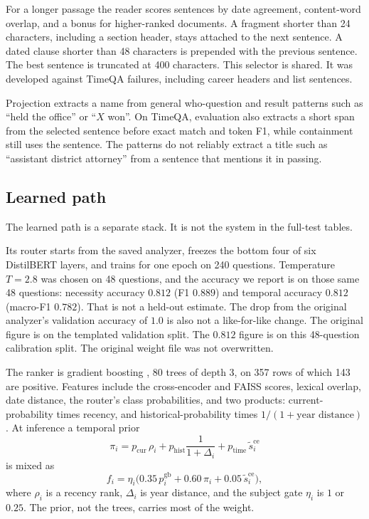 \documentclass[11pt]{article}
\begin{document}
For a longer passage the reader scores sentences by date agreement, content-word overlap, and a bonus for higher-ranked documents.
A fragment shorter than 24 characters, including a section header, stays attached to the next sentence.
A dated clause shorter than 48 characters is prepended with the previous sentence.
The best sentence is truncated at 400 characters.
This selector is shared.
It was developed against TimeQA failures, including career headers and list sentences.

Projection extracts a name from general who-question and result patterns such as ``held the office'' or ``$X$ won''.
On TimeQA, evaluation also extracts a short span from the selected sentence before exact match and token F1, while containment still uses the sentence.
The patterns do not reliably extract a title such as ``assistant district attorney'' from a sentence that mentions it in passing.

\subsection{Learned path}
\label{sec:learned}

The learned path is a separate stack.
It is not the system in the full-test tables.

Its router starts from the saved analyzer, freezes the bottom four of six DistilBERT layers, and trains for one epoch on 240 questions.
Temperature $T=2.8$ was chosen on 48 questions, and the accuracy we report is on those same 48 questions: necessity accuracy $0.812$ (F1 $0.889$) and temporal accuracy $0.812$ (macro-F1 $0.782$).
That is not a held-out estimate.
The drop from the original analyzer's validation accuracy of $1.0$ is also not a like-for-like change.
The original figure is on the templated validation split.
The $0.812$ figure is on this 48-question calibration split.
The original weight file was not overwritten.

The ranker is gradient boosting \cite{friedman2001gbm}, 80 trees of depth 3, on 357 rows of which 143 are positive.
Features include the cross-encoder and FAISS scores, lexical overlap, date distance, the router's class probabilities, and two products: current-probability times recency, and historical-probability times $1/(1+\text{year distance})$.
At inference a temporal prior
\begin{equation}
\pi_i
= p_{\mathrm{cur}}\,\rho_i
+ p_{\mathrm{hist}}\frac{1}{1+\Delta_i}
+ p_{\mathrm{time}}\,\tilde{s}^{\mathrm{ce}}_i
\label{eq:prior}
\end{equation}
is mixed as
\begin{equation}
f_i = \eta_i\big(0.35\,p^{\mathrm{gb}}_i + 0.60\,\pi_i + 0.05\,\tilde{s}^{\mathrm{ce}}_i\big),
\label{eq:learnedrank}
\end{equation}
where $\rho_i$ is a recency rank, $\Delta_i$ is year distance, and the subject gate $\eta_i$ is $1$ or $0.25$.
The prior, not the trees, carries most of the weight.
\end{document}
